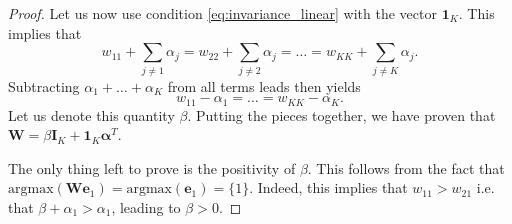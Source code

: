 \documentclass[10pt,a4paper]{amsart}
\newcommand{\bI}{\mathbf{I}}%
\newcommand{\bW}{\mathbf{W}}%
\newcommand{\ba}{\boldsymbol{\alpha}}%
\newcommand{\be}{\mathbf{e}}%
\newcommand{\bun}{\mathbf{1}}%
\begin{document}
\begin{proof}
Let us now use condition \eqref{eq:invariance_linear} with the vector $\bun_K$. This implies that 
\begin{equation}
    w_{11} + \sum_{j \neq 1} \alpha_j =  w_{22} + \sum_{j \neq 2} \alpha_j = \ldots = w_{KK} + \sum_{j \neq K} \alpha_j.
\end{equation}
Subtracting $\alpha_1 + \ldots + \alpha_K$ from all terms leads then yields
\begin{equation}
    w_{11} - \alpha_1 = \ldots =  w_{KK} - \alpha_K.
\end{equation}
Let us denote this quantity $\beta$. Putting the pieces together, we have proven that $\bW = \beta \bI_K + \bun_K \ba ^T$.

The only thing left to prove is the positivity of $\beta$. This follows from the fact that $\text{argmax}(\bW \be_1) = \text{argmax}(\be_1) = \{1\}$. Indeed, this implies that $w_{11}>w_{21}$ i.e. that $\beta + \alpha_1 > \alpha_1$, leading to $\beta>0$.
\end{proof}
\end{document}
